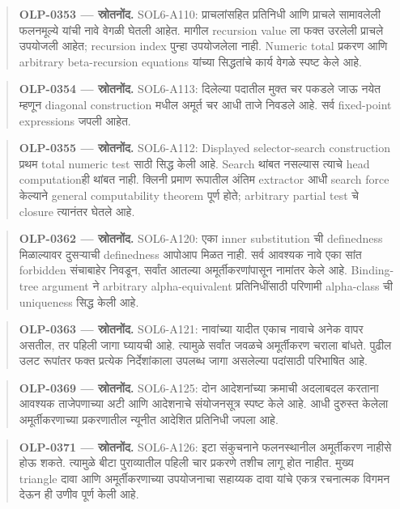 \begin{quote}\small\textbf{OLP-0353 — स्रोतनोंद.} SOL6-A110: प्राचलांसहित प्रतिनिधी आणि प्राचले सामावलेली फलनमूल्ये यांची नावे वेगळी घेतली आहेत. मागील recursion value ला फक्त उरलेली प्राचले उपयोजली आहेत; recursion index पुन्हा उपयोजलेला नाही. Numeric total प्रकरण आणि arbitrary beta-recursion equations यांच्या सिद्धतांचे कार्य वेगळे स्पष्ट केले आहे.\end{quote}
\begin{quote}\small\textbf{OLP-0354 — स्रोतनोंद.} SOL6-A113: दिलेल्या पदातील मुक्त चर पकडले जाऊ नयेत म्हणून diagonal construction मधील अमूर्त चर आधी ताजे निवडले आहे. सर्व fixed-point expressions जपली आहेत.\end{quote}
\begin{quote}\small\textbf{OLP-0355 — स्रोतनोंद.} SOL6-A112: Displayed selector-search construction प्रथम total numeric test साठी सिद्ध केली आहे. Search थांबत नसल्यास त्याचे head computationही थांबत नाही. क्लिनी प्रमाण रूपातील अंतिम extractor आधी search force केल्याने general computability theorem पूर्ण होते; arbitrary partial test चे closure त्यानंतर घेतले आहे.\end{quote}
\begin{quote}\small\textbf{OLP-0362 — स्रोतनोंद.} SOL6-A120: एका inner substitution ची definedness मिळाल्यावर दुसऱ्याची definedness आपोआप मिळत नाही. सर्व आवश्यक नावे एका सांत forbidden संचाबाहेर निवडून, सर्वांत आतल्या अमूर्तीकरणांपासून नामांतर केले आहे. Binding-tree argument ने arbitrary alpha-equivalent प्रतिनिधींसाठी परिणामी alpha-class ची uniqueness सिद्ध केली आहे.\end{quote}
\begin{quote}\small\textbf{OLP-0363 — स्रोतनोंद.} SOL6-A121: नावांच्या यादीत एकाच नावाचे अनेक वापर असतील, तर पहिली जागा घ्यायची आहे. त्यामुळे सर्वांत जवळचे अमूर्तीकरण चराला बांधते. पुढील उलट रूपांतर फक्त प्रत्येक निर्देशांकाला उपलब्ध जागा असलेल्या पदांसाठी परिभाषित आहे.\end{quote}
\begin{quote}\small\textbf{OLP-0369 — स्रोतनोंद.} SOL6-A125: दोन आदेशनांच्या क्रमाची अदलाबदल करताना आवश्यक ताजेपणाच्या अटी आणि आदेशनाचे संयोजनसूत्र स्पष्ट केले आहे. आधी दुरुस्त केलेला अमूर्तीकरणाच्या प्रकरणातील न्यूनीत आदेशित प्रतिनिधी जपला आहे.\end{quote}
\begin{quote}\small\textbf{OLP-0371 — स्रोतनोंद.} SOL6-A126: इटा संकुचनाने फलनस्थानील अमूर्तीकरण नाहीसे होऊ शकते. त्यामुळे बीटा पुराव्यातील पहिली चार प्रकरणे तशीच लागू होत नाहीत. मुख्य triangle दावा आणि अमूर्तीकरणाच्या उपयोजनाचा सहाय्यक दावा यांचे एकत्र रचनात्मक विगमन देऊन ही उणीव पूर्ण केली आहे.\end{quote}

